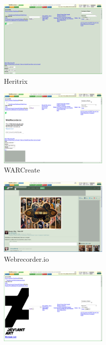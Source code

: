 \documentclass{article}
\begin{document}
\begin{center}
\begin{figure}[ht]
    \centering
    \includegraphics[width=0.475\textwidth,natwidth=700,natheight=700]{ex2-heritrix.png}
    \caption{Heritrix}
    \label{fig:url2_heritrix}
\end{figure}
\begin{figure}[ht]
    \centering
    \includegraphics[width=0.475\textwidth,natwidth=700,natheight=700]{ex2-warcreate.png}
    \caption{WARCreate}
    \label{fig:url2_war_create}
\end{figure}
\begin{figure}[ht]
    \centering
    \includegraphics[width=0.475\textwidth,natwidth=700,natheight=700]{ex2-webrecorder.png}
    \caption{Webrecorder.io}
    \label{fig:url2_webrecorder}
\end{figure}
\begin{figure}[ht]
    \centering
    \includegraphics[width=0.475\textwidth,natwidth=700,natheight=700]{ex2-wget.png}

\end{figure}
\end{center}
\end{document}
